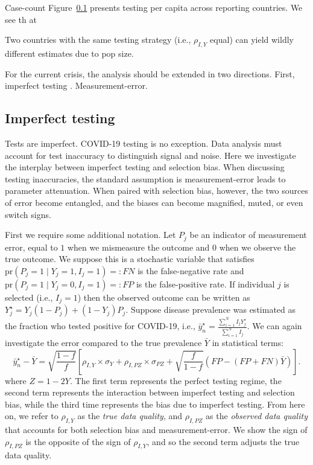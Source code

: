 \documentclass[12pt]{article}
\numberwithin{equation}{section}
\theoremstyle{plain}
\def\pr{\text{pr}}
\begin{document}
Case-count
Figure~\ref{} presents testing per capita across reporting countries.  We see th at

Two countries with the same testing strategy (i.e., $\rho_{I,Y}$ equal) can yield wildly different estimates due to pop size.

For the current crisis, the analysis should be extended in two directions.  First, imperfect testing . Measurement-error.

\subsection{Imperfect testing}

Tests are imperfect.  COVID-19 testing is no exception.  Data analysis must account for test inaccuracy to distinguish signal and noise.  Here we investigate the interplay between imperfect testing and selection bias.  When discussing testing inaccuracies, the standard assumption is measurement-error leads to parameter attenuation.  When paired with selection bias, however, the two sources of error become entangled, and the biases can become magnified, muted, or even switch signs.

First we require some additional notation.  Let $P_j$ be an indicator of measurement error, equal to $1$ when we mismeasure the outcome and $0$ when we observe the true outcome. We suppose this is a stochastic variable that satisfies $\pr(P_j = 1 \mid Y_j = 1, I_j = 1) =: FN$ is the false-negative rate and $\pr(P_j = 1 \mid Y_j = 0, I_j = 1) =: FP$ is the false-positive rate.  If individual $j$ is selected (i.e., $I_j = 1$) then the observed outcome can be written as $Y_j^\star = Y_j(1-P_j) + (1-Y_j) P_j$.  Suppose disease prevalence was estimated as the fraction who tested positive for COVID-19, i.e., $\bar y_n^\star = \frac{\sum_{i=1}^N I_j Y_j^\star}{\sum_{i=1}^N I_j}$.  We can again investigate the error compared to the true prevalence $\bar Y$ in statistical terms:
$$
\bar y_n^\star - \bar Y = \sqrt{\frac{1-f}{f}} \left[ \rho_{I,Y} \times \sigma_Y + \rho_{I,PZ} \times \sigma_{PZ} + \sqrt{\frac{f}{1-f}}  \left( FP - (FP+FN) \bar Y \right) \right] .
$$
where $Z = 1-2Y$. The first term represents the perfect testing regime, the second term represents the interaction between imperfect testing and selection bias, while the third time represents the bias due to imperfect testing.  From here on, we refer to $\rho_{I,Y}$ as the \emph{true data quality}, and $\rho_{I,PZ}$ as the \emph{observed data quality} that accounts for both selection bias and measurement-error.  We show the sign of $\rho_{I,PZ}$ is the opposite of the sign of $\rho_{I,Y}$, and so the second term adjusts the true data quality.
\end{document}

